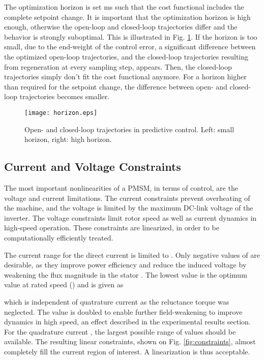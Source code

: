 \documentclass[a4paper,11pt,fleqn]{article}
\begin{document}
The optimization horizon is set  ms such that the cost functional includes the complete setpoint change. It is important that the optimization horizon is high enough, otherwise the open-loop and closed-loop trajectories differ and the behavior is strongly suboptimal. This is illustrated in Fig. \ref{fig:horizon}. If the horizon is too small, due to the end-weight of the control error, a significant difference between the optimized open-loop trajectories, and the closed-loop trajectories resulting from regeneration at every sampling step, appears. Then, the closed-loop trajectories simply don't fit the cost functional anymore. For a horizon higher than required for the setpoint change, the difference between open- and closed-loop trajectories becomes smaller.




\begin{figure}[!ht]
  \centering
  \texttt{[image: horizon.eps]}
  \caption{Open- and closed-loop trajectories in predictive control. Left: small horizon, right: high horizon.\label{fig:horizon}}
\end{figure}




\subsection*{Current and Voltage Constraints}

The most important nonlinearities of a PMSM, in terms of control, are the  voltage and current limitations. The current constraints prevent overheating of the machine, and the voltage is limited by the maximum DC-link voltage of the inverter. The voltage constraints limit rotor speed as well as current dynamics in high-speed operation. These constraints are linearized, in order to be computationally efficiently treated. 

The current range for the direct current  is limited to . Only negative values of  are desirable, as they improve power efficiency and reduce the induced voltage by weakening the flux magnitude in the stator \cite{inhFW} \cite{PMSMeff}. The lowest value  is the optimum value at rated speed () and is given as 

which is independent of quatrature current  as the reluctance torque was neglected. The value is doubled to enable further field-weakening to improve dynamics in high speed, an effect described in the experimental results section. For the quadrature current , the largest possible range of values should be available. The resulting linear constraints, shown on Fig. \ref{fig:constraints}, almost completely fill the current region of interest. A linearization is thus acceptable.
\end{document}
